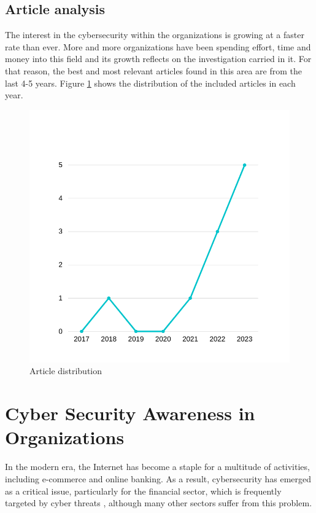 \documentclass[journal]{IEEEtran}
\begin{document}
\subsection{Article analysis}

The interest in the cybersecurity within the organizations is growing at a faster rate than ever. More and more organizations have been spending effort, time and money into this field and its growth reflects on the investigation carried in it. For that reason, the best and most relevant articles found in this area are from the last 4-5 years. Figure \ref{years} shows the distribution of the included articles in each year.

\begin{figure}[!h]
    \centering
    \includegraphics[width=\linewidth]{images/years.png}
    \caption{Article distribution}
    \label{years}
\end{figure}



\section{Cyber Security Awareness in Organizations}

In the modern era, the Internet has become a staple for a multitude of activities, including e-commerce and online banking. As a result, cybersecurity has emerged as a critical issue, particularly for the financial sector, which is frequently targeted by cyber threats \cite{Edu_article1}, although many other sectors suffer from this problem. 
\end{document}

